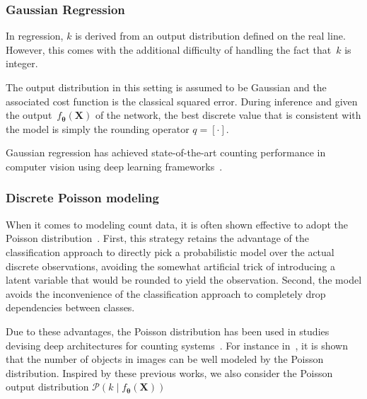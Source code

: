 \subsubsection{Gaussian Regression}
In regression, $k$ is derived from an output distribution defined on the real line.
However, this comes with the additional difficulty of handling the fact that~$k$ is integer.

The output distribution in this setting is assumed to be Gaussian and the associated cost function is the classical squared error.
During inference and given the output~$f_{\mathbf{\mathbf{\theta}}}\left(\mathbf{X}\right)$ of the network, the best discrete value that is consistent with the model is simply the rounding operator $q = \left[\cdot\right]$.

Gaussian regression has achieved state-of-the-art counting performance in computer vision using deep learning frameworks~\cite{zhang15, marsden16, boominathan16}.

\subsubsection{Discrete Poisson modeling}
When it comes to modeling count data, it is often shown effective to adopt the Poisson distribution~\cite{fallah09}.
First, this strategy retains the advantage of the classification approach to directly pick a probabilistic model over the actual discrete observations, avoiding the somewhat artificial trick of introducing a latent variable that would be rounded to yield the observation.
Second, the model avoids the inconvenience of the classification approach to completely drop dependencies between classes.

Due to these advantages, the Poisson distribution has been used in studies devising deep architectures for counting systems~\cite{Rezatofigh16}.
For instance in~\cite{fallah09, chan09, Rezatofigh16}, it is shown that the number of objects in images can be well modeled by the Poisson distribution. Inspired by these previous works, we also consider the Poisson output distribution \(\mathcal{P}\left(k\mid f_{\mathbf{\mathbf{\theta}}}\left(\mathbf{X}\right)\right)\)

